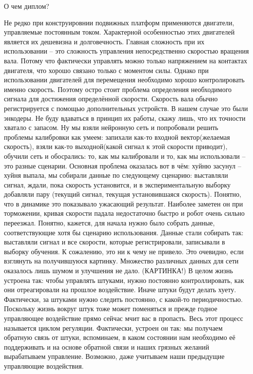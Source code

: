 \documentclass[14pt,twoside]{article}
\begin{document}
\newpage
    О чем диплом?

Не редко при конструировнии подвижных платформ применяются двигатели, управляемые постоянным током. Характерной особенностью этих двигателей является их дешевизна и долговечность. Главная сложность при их использовании -- это сложность управления непосредственно скоростью вращения вала. Потому что фактически управлять можно только напряжением на контактах двигателя, что хорошо связано только с моментом силы. Однако при использовании двигателей для перемещения необходимо хорошо контролировать именно скорость. Поэтому остро стоит проблема определения необходимого сигнала для достижения определённой скорости. Скорость вала обычно регистрируется с помощью дополнительных устройств. В нашем случае это были энкодеры. Не буду вдаваться в принцип их работы, скажу лишь, что их точности хватало с запасом.
Ну мы взяли нейронную сеть и попробовали решить проблемы калибровки как умеем: запихали как-то входной вектор(желаемая скорость), взяли как-то выходной(какой сигнал к этой скорости приводит), обучили сеть и обосрались: то, как мы калибровали и то, как мы использовали -- это разные сценарии.
Основная проблема оказалась вот в чём: хуйню засунул -- хуйня выпала, мы собирали данные по следующему сценарию: выставляли сигнал, ждали, пока скорость установится, и в экспериментальную выборку добавляли пару (текущий сигнал, текущая установившаяся скорость). Понятно, что в динамике это показывало ужасающий результат. Наиболее заметен он при торможении, кривая скорости падала недостаточно быстро и робот очень сильно переезжал.
Понятно, кажется, для начала нужно было собрать данные, соответствующие хотя бы сценарию использования. Данные стали собирать так: выставляли сигнал и все скорости, которые регистрировали, записывали в выборку обучения. К сожалению, это ни к чему не привело. Это очевидно, если взглянуть на получившуюся картинку. Множество различных данных для сети оказалось лишь шумом и улучшения не дало. (КАРТИНКА!)
В целом жизнь устроена так: чтобы управлять штуками, нужно постоянно контроллировать, как они отреагировали на прошлое воздействие. Иначе штуки будут делать хуету. Фактически, за штуками нужно следить постоянно, с какой-то периодичностью. Поскольку жизнь вокруг штук тоже может поменяться и прежде годное управляющее воздействие прямо сейчас мчит вас в пропасть. Весь этот процесс называется циклом регуляции. Фактически, устроен он так: мы получаем обратную связь от штуки, вспоминаем, в каком состоянии нам необходимо её поддерживать и на основе обратной связи и наших грязных желаний вырабатываем управление. Возможно, даже учитываем наши предыдущие управляющие воздействия.
\end{document}
